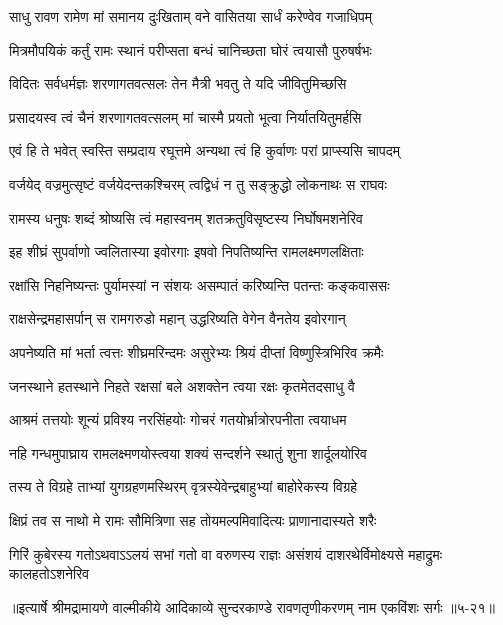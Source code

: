 \twolineshloka
{साधु रावण रामेण मां समानय दुःखिताम्}
{वने वासितया सार्धं करेण्वेव गजाधिपम्} %

\twolineshloka
{मित्रमौपयिकं कर्तुं रामः स्थानं परीप्सता}
{बन्धं चानिच्छता घोरं त्वयासौ पुरुषर्षभः} %

\twolineshloka
{विदितः सर्वधर्मज्ञः शरणागतवत्सलः}
{तेन मैत्री भवतु ते यदि जीवितुमिच्छसि} %

\twolineshloka
{प्रसादयस्व त्वं चैनं शरणागतवत्सलम्}
{मां चास्मै प्रयतो भूत्वा निर्यातयितुमर्हसि} %

\twolineshloka
{एवं हि ते भवेत् स्वस्ति सम्प्रदाय रघूत्तमे}
{अन्यथा त्वं हि कुर्वाणः परां प्राप्स्यसि चापदम्} %

\twolineshloka
{वर्जयेद् वज्रमुत्सृष्टं वर्जयेदन्तकश्चिरम्}
{त्वद्विधं न तु सङ्क्रुद्धो लोकनाथः स राघवः} %

\twolineshloka
{रामस्य धनुषः शब्दं श्रोष्यसि त्वं महास्वनम्}
{शतक्रतुविसृष्टस्य निर्घोषमशनेरिव} %

\twolineshloka
{इह शीघ्रं सुपर्वाणो ज्वलितास्या इवोरगाः}
{इषवो निपतिष्यन्ति रामलक्ष्मणलक्षिताः} %

\twolineshloka
{रक्षांसि निहनिष्यन्तः पुर्यामस्यां न संशयः}
{असम्पातं करिष्यन्ति पतन्तः कङ्कवाससः} %

\twolineshloka
{राक्षसेन्द्रमहासर्पान् स रामगरुडो महान्}
{उद्धरिष्यति वेगेन वैनतेय इवोरगान्} %

\twolineshloka
{अपनेष्यति मां भर्ता त्वत्तः शीघ्रमरिन्दमः}
{असुरेभ्यः श्रियं दीप्तां विष्णुस्त्रिभिरिव क्रमैः} %

\twolineshloka
{जनस्थाने हतस्थाने निहते रक्षसां बले}
{अशक्तेन त्वया रक्षः कृतमेतदसाधु वै} %

\twolineshloka
{आश्रमं तत्तयोः शून्यं प्रविश्य नरसिंहयोः}
{गोचरं गतयोर्भ्रात्रोरपनीता त्वयाधम} %

\twolineshloka
{नहि गन्धमुपाघ्राय रामलक्ष्मणयोस्त्वया}
{शक्यं सन्दर्शने स्थातुं शुना शार्दूलयोरिव} %

\twolineshloka
{तस्य ते विग्रहे ताभ्यां युगग्रहणमस्थिरम्}
{वृत्रस्येवेन्द्रबाहुभ्यां बाहोरेकस्य विग्रहे} %

\twolineshloka
{क्षिप्रं तव स नाथो मे रामः सौमित्रिणा सह}
{तोयमल्पमिवादित्यः प्राणानादास्यते शरैः} %

\twolineshloka
{गिरिं कुबेरस्य गतोऽथवाऽऽलयं सभां गतो वा वरुणस्य राज्ञः}
{असंशयं दाशरथेर्विमोक्ष्यसे महाद्रुमः कालहतोऽशनेरिव} %


॥इत्यार्षे श्रीमद्रामायणे वाल्मीकीये आदिकाव्ये सुन्दरकाण्डे रावणतृणीकरणम् नाम एकविंशः सर्गः ॥५-२१॥
